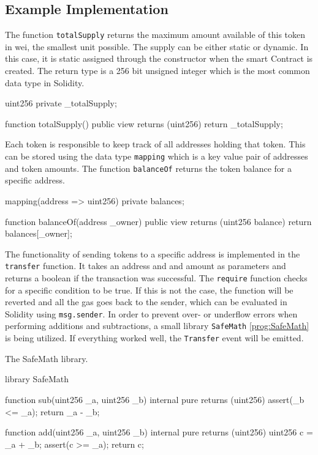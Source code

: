 \subsection{Example Implementation}
The function \texttt{totalSupply} returns the maximum amount available of this token in wei, the smallest unit possible. The supply can be either static or dynamic. In this case, it is static assigned through the constructor when the smart Contract is created. The return type is a 256 bit unsigned integer which is the most common data type in Solidity.

\begin{GenericCode}
 uint256 private _totalSupply;
  
 function totalSupply() public view returns (uint256) {
   return _totalSupply;
 }	
\end{GenericCode}

Each token is responsible to keep track of all addresses holding that token. This can be stored using the data type \texttt{mapping} which is a key value pair of addresses and token amounts. The function \texttt{balanceOf} returns the token balance for a specific address.

\begin{GenericCode}
 mapping(address => uint256) private balances;
  
 function balanceOf(address _owner) public view returns (uint256 balance) {
   return balances[_owner];
 }
\end{GenericCode}

The functionality of sending tokens to a specific address is implemented in the \texttt{transfer} function. It takes an address and and amount as parameters and returns a boolean if the transaction was successful. The \texttt{require} function checks for a specific condition to be true. If this is not the case, the function will be reverted and all the gas goes back to the sender, which can be evaluated in Solidity using \texttt{msg.sender}. In order to prevent over- or underflow errors when performing additions and subtractions, a small library \texttt{SafeMath} \ref{prog:SafeMath} is being utilized. If everything worked well, the \texttt{Transfer} event will be emitted.

\begin{program}
\caption{The SafeMath library.}
\label{prog:SafeMath}
\begin{GenericCode}
library SafeMath {
  function sub(uint256 _a, uint256 _b) internal pure returns (uint256) {
    assert(_b <= _a);
    return _a - _b;
  }

  function add(uint256 _a, uint256 _b) internal pure returns (uint256) {
    uint256 c = _a + _b;
    assert(c >= _a);
    return c;
  }
}
\end{GenericCode}
\end{program}

